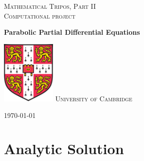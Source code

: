 \documentclass[a4paper,11pt]{article}
\begin{document}
\lstset{language = Matlab}
\begin{titlepage} %
	
	\center %
	
	\vspace*{3cm}

	\textsc{Mathematical Tripos, Part II}\\
	\textsc{Computational project}
	\begin{center}
      {\huge\bfseries Parabolic Partial Differential Equations\\[0.4cm]
}     \end{center}
	
	\vfill
	\vfill\vfill\vfill\vfill
	\includegraphics*[width = 2.675cm, height = 3.1cm]{coat.png}
	\vfill
    \textsc{University of Cambridge}
	
	\vspace*{\fill}
	\vfill
	{\large\today} 
	\vfill
	
\end{titlepage}
\setcounter{tocdepth}{3}
\tableofcontents
\newpage
\section{Analytic Solution}
\end{document}
